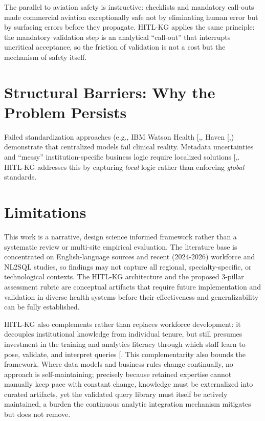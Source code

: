 \documentclass[
  american,
  11pt,
  letterpaper,
  oneside  ,captions=tableheading
]{scrartcl}
\begin{document}
The parallel to aviation safety is instructive: checklists and mandatory
call-outs made commercial aviation exceptionally safe not by eliminating
human error but by surfacing errors before they propagate. HITL-KG
applies the same principle: the mandatory validation step is an
analytical ``call-out'' that interrupts uncritical acceptance, so the
friction of validation is not a cost but the mechanism of safety itself.

\section{Structural Barriers: Why the Problem
Persists}\label{structural-barriers-why-the-problem-persists}

Failed standardization approaches (e.g., IBM Watson Health
{[},\citeproc{ref-strickland2019}{82}{]},
Haven
{[},\citeproc{ref-acchiardo2021}{84}{]})
demonstrate that centralized models fail clinical reality. Metadata
uncertainties and ``messy'' institution-specific business logic require
localized solutions
{[},\citeproc{ref-strickland2019}{82}{]}.
HITL-KG addresses this by capturing \emph{local} logic rather than
enforcing \emph{global} standards.

\section{Limitations}\label{limitations}

This work is a narrative, design science informed framework rather than
a systematic review or multi-site empirical evaluation. The literature
base is concentrated on English-language sources and recent (2024-2026)
workforce and NL2SQL studies, so findings may not capture all regional,
specialty-specific, or technological contexts. The HITL-KG architecture
and the proposed 3-pillar assessment rubric are conceptual artifacts
that require future implementation and validation in diverse health
systems before their effectiveness and generalizability can be fully
established.

HITL-KG also complements rather than replaces workforce development: it
decouples institutional knowledge from individual tenure, but still
presumes investment in the training and analytics literacy through which
staff learn to pose, validate, and interpret queries
{[}\citeproc{ref-ledikwe2013}{17}{]}. This complementarity also bounds
the framework. Where data models and business rules change continually,
no approach is self-maintaining; precisely because retained expertise
cannot manually keep pace with constant change, knowledge must be
externalized into curated artifacts, yet the validated query library
must itself be actively maintained, a burden the continuous analytic
integration mechanism mitigates but does not remove.
\end{document}
